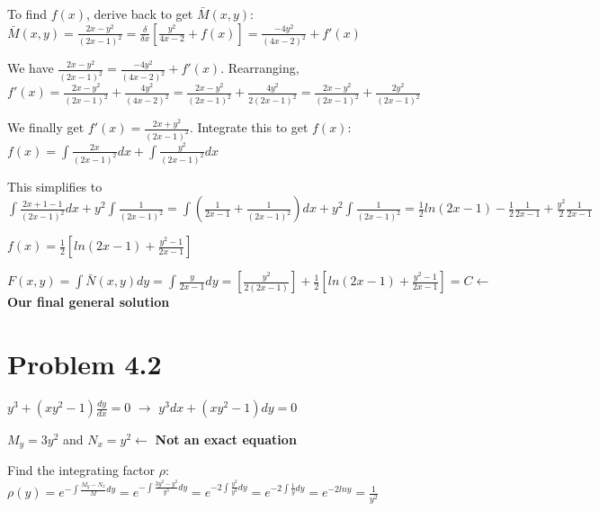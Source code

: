 \documentclass{article}
\begin{document}
\noindent To find $f(x)$, derive back to get $\bar{M}(x, y)$: $\bar{M}(x, y) = \frac{2x - y^{2}}{(2x - 1)^{2}} = \frac{\delta}{\delta x}[\frac{y^{2}}{4x - 2} + f(x)] = \frac{-4y^{2}}{(4x - 2)^{2}} + f'(x)$ \par\vspace{0.25cm}

\noindent We have $\frac{2x - y^{2}}{(2x - 1)^{2}} = \frac{-4y^{2}}{(4x - 2)^{2}} + f'(x)$.  Rearranging, $f'(x) = \frac{2x - y^{2}}{(2x - 1)^{2}} + \frac{4y^{2}}{(4x - 2)^{2}} = \frac{2x - y^{2}}{(2x - 1)^{2}} + \frac{4y^{2}}{2(2x - 1)^{2}} = \frac{2x - y^{2}}{(2x - 1)^{2}} + \frac{2y^{2}}{(2x - 1)^{2}}$ \par
\noindent We finally get $f'(x) = \frac{2x + y^{2}}{(2x - 1)^{2}}$.  Integrate this to get $f(x)$: $f(x) = \int \frac{2x}{(2x - 1)^{2}} dx + \int \frac{y^{2}}{(2x - 1)^{2}}dx$ \par
\noindent This simplifies to $\int \frac{2x + 1 - 1}{(2x - 1)^{2}}dx + y^{2} \int \frac{1}{(2x - 1)^{2}} = \int (\frac{1}{2x - 1} + \frac{1}{(2x - 1)^{2}})dx + y^{2} \int \frac{1}{(2x - 1)^{2}} = \frac{1}{2}ln(2x - 1) - \frac{1}{2} \frac{1}{2x - 1} + \frac{y^{2}}{2} \frac{1}{2x - 1}$ \par
\noindent $f(x) = \frac{1}{2}[ln(2x - 1) + \frac{y^{2} - 1}{2x - 1}]$ \par\vspace{0.25cm}

\noindent $F(x, y) =  \int \bar{N}(x, y)dy = \int \frac{y}{2x - 1}dy = [\frac{y^{2}}{2(2x - 1)}] + \frac{1}{2}[ln(2x - 1) + \frac{y^{2} - 1}{2x - 1}] = C \leftarrow$ \textbf{Our final general solution}

\section{Problem 4.2}

$y^{3} + (xy^{2} - 1)\frac{dy}{dx} = 0$ $\rightarrow$ $y^{3}dx + (xy^{2} - 1)dy = 0$ \par\vspace{0.25cm}

\noindent $M_{y} = 3y^{2}$ and $N_{x} = y^{2} \leftarrow$ \textbf{Not an exact equation}

\noindent Find the integrating factor $\rho$: $\rho (y) = e^{-\int \frac{M_{y} - N_{x}}{M}dy} = e^{-\int \frac{3y^{2} - y^{2}}{y^{3}}dy} = e^{-2\int \frac{y^{2}}{y^{3}}dy} = e^{-2 \int \frac{1}{y}dy} = e^{-2lny} = \frac{1}{y^{2}}$ \par
\end{document}
